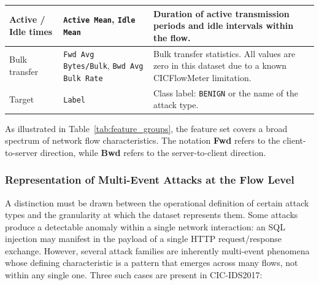 \documentclass[12pt,a4paper]{article}
\begin{document}
\newpage                                        
\begin{table}[H]
    \centering
    \begin{tabular}{|p{3cm}|p{4.5cm}|p{6.5cm}|}
        \hline
        Active / Idle times
                       & \texttt{Active Mean}, \texttt{Idle Mean}
                       & Duration of active transmission periods and idle intervals within the flow.\\
        \hline
        Bulk transfer
                       & \texttt{Fwd Avg Bytes/Bulk}, \texttt{Bwd Avg Bulk Rate}
                       & Bulk transfer statistics. All values are zero in this dataset due to a known
        CICFlowMeter limitation.                                                                                                                  \\
        \hline
        Target
                       & \texttt{Label}
                       & Class label: \texttt{BENIGN} or the name of the attack type.                                                             \\
        \hline
    \end{tabular}
\end{table}

As illustrated in Table~\ref{tab:feature_groups}, the feature set covers a broad
spectrum of network flow characteristics. The notation \textbf{Fwd} refers to the
client-to-server direction, while \textbf{Bwd} refers to the server-to-client direction.

\subsubsection{Representation of Multi-Event Attacks at the Flow Level}

A distinction must be drawn between the operational definition of certain attack types
and the granularity at which the dataset represents them. Some attacks produce a
detectable anomaly within a single network interaction: an SQL injection may manifest
in the payload of a single HTTP request/response exchange. However, several attack
families are inherently multi-event phenomena whose defining characteristic is a
pattern that emerges across many flows, not within any single one. Three such cases
are present in CIC-IDS2017:
\end{document}
